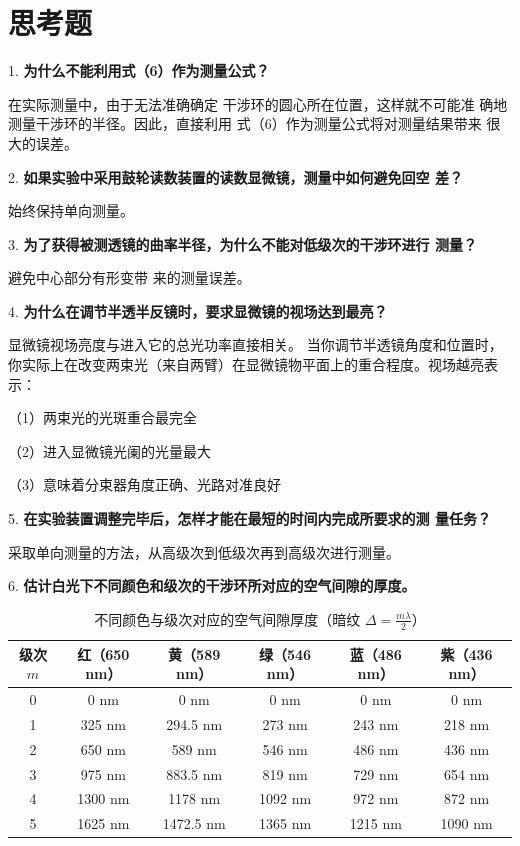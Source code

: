 \documentclass[12pt]{article}
\renewcommand{\arraystretch}{1.5}
\begin{document}
\section{思考题}

1. \textbf{为什么不能利用式（6）作为测量公式？}

在实际测量中，由于无法准确确定
干涉环的圆心所在位置，这样就不可能准
确地测量干涉环的半径。因此，直接利用
式（6）作为测量公式将对测量结果带来
很大的误差。

2. \textbf{如果实验中采用鼓轮读数装置的读数显微镜，测量中如何避免回空
差？}

始终保持单向测量。

3. \textbf{为了获得被测透镜的曲率半径，为什么不能对低级次的干涉环进行
测量？}

避免中心部分有形变带
来的测量误差。

4. \textbf{为什么在调节半透半反镜时，要求显微镜的视场达到最亮？}

显微镜视场亮度与进入它的总光功率直接相关。
当你调节半透镜角度和位置时，你实际上在改变两束光（来自两臂）在显微镜物平面上的重合程度。视场越亮表示：

（1）两束光的光斑重合最完全

（2）进入显微镜光阑的光量最大

（3）意味着分束器角度正确、光路对准良好

5. \textbf{在实验装置调整完毕后，怎样才能在最短的时间内完成所要求的测
量任务？}

采取单向测量的方法，从高级次到低级次再到高级次进行测量。

6. \textbf{估计白光下不同颜色和级次的干涉环所对应的空气间隙的厚度。}

\begin{table}[H]
\centering
\caption{不同颜色与级次对应的空气间隙厚度（暗纹 $\Delta=\frac{m\lambda}{2}$）}
\renewcommand{\arraystretch}{1.2}
\begin{tabular}{cccccc}
\toprule
级次 $m$ 
& 红（650 nm） 
& 黄（589 nm） 
& 绿（546 nm） 
& 蓝（486 nm） 
& 紫（436 nm） \\
\midrule
0 & 0 nm  & 0 nm & 0 nm & 0 nm & 0 nm \\
1 & 325 nm  & 294.5 nm & 273 nm  & 243 nm & 218 nm \\
2 & 650 nm  & 589 nm  & 546 nm & 486 nm  & 436 nm  \\
3 & 975 nm  & 883.5 nm & 819 nm  & 729 nm  & 654 nm  \\
4 & 1300 nm  & 1178 nm  & 1092 nm  & 972 nm  & 872 nm  \\
5 & 1625 nm  & 1472.5 nm  & 1365 nm  & 1215 nm  & 1090 nm  \\
\bottomrule
\end{tabular}
\end{table}
\end{document}
